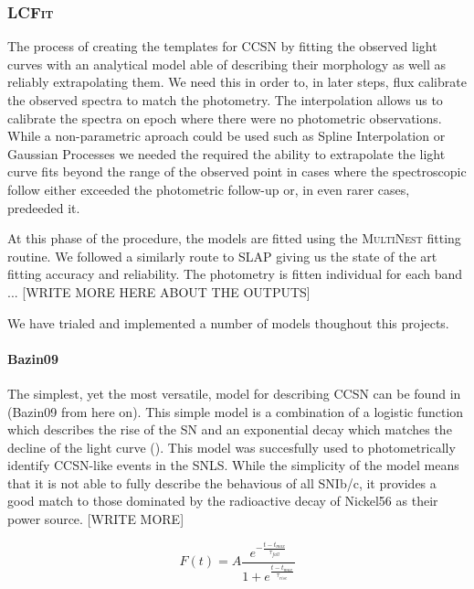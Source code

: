 \subsubsection{\textsc{LCFit}} \label{sec:LCFit}
The process of creating the templates for CCSN by fitting the observed light curves with an analytical model able of describing their morphology as well as reliably extrapolating them. We need this in order to, in later steps, flux calibrate the observed spectra to match the photometry. The interpolation allows us to calibrate the spectra on epoch where there were no photometric observations. While a non-parametric aproach could be used such as Spline Interpolation or Gaussian Processes we needed the required the ability to extrapolate the light curve fits beyond the range of the observed point in cases where the spectroscopic follow either exceeded the photometric follow-up or, in even rarer cases, predeeded it.

At this phase of the procedure, the models are fitted using the \textsc{MultiNest} fitting routine. We followed a similarly route to \textsc{SLAP} giving us the state of the art fitting accuracy and reliability. The photometry is fitten individual for each band ... [WRITE MORE HERE ABOUT THE OUTPUTS]

We have trialed and implemented a number of models thoughout this projects.

\paragraph{Bazin09}
The simplest, yet the most versatile, model for describing CCSN can be found in \citet{Bazin2009} (Bazin09 from here on). This simple model is a combination of a logistic function which describes the rise of the SN and an exponential decay which matches the decline of the light curve (). This model was succesfully used to photometrically identify CCSN-like events in the SNLS. While the simplicity of the model means that it is not able to fully describe the behavious of all SNIb/c, it provides a good match to those dominated by the radioactive decay of Nickel56 as their power source. [WRITE MORE]

\begin{equation}
\label{eq:Bazin09}
  F(t) = A \frac{e^{-\frac{t - t_{max}}{\tau_{fall}}}} {1 + e^{\frac{t - t_{max}}{\tau_{rise}}}}
\end{equation}

